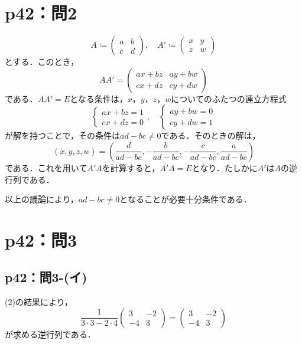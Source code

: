 \documentclass[a4paper,10pt,fleqn]{ltjsarticle}
\begin{document}
\section*{p42：問2}

\begin{leftbar}
    \[
        A \coloneqq \begin{pmatrix} a & b \\ c & d \end{pmatrix},\quad A' \coloneqq \begin{pmatrix} x & y \\ z & w \end{pmatrix}
    \]
    とする．このとき，
    \[
        A A' = \begin{pmatrix} a x + b z & ay + bw \\ cx + dz & cy +dw \end{pmatrix}
    \]
    である．$AA'=E$となる条件は，$x$，$y$，$z$，$w$についてのふたつの連立方程式
    \[
        \begin{cases}
            ax+bz =1 \\
            cx+dz =0
        \end{cases}
        ,\quad
        \begin{cases}
            ay+bw=0 \\
            cy+dw=1
        \end{cases}
    \]
    が解を持つことで，その条件は$ad-bc \ne 0$である．そのときの解は，
    \[
        (x,y,z,w)=  (\frac{d}{ad-bc},-\frac{b}{ad-bc},-\frac{c}{ad-bc},\frac{a}{ad-bc})
    \]
    である．これを用いて$A'A$を計算すると，$A' A =E$となり．たしかに$A'$は$A$の逆行列である．

    以上の議論により，$ad - bc \ne 0$となることが必要十分条件である．
\end{leftbar}

\section*{p42：問3}

\subsection*{p42：問3-(イ)}

\begin{leftbar}
    (2)の結果により，
    \[
        \frac{1}{3 \cdot 3 - 2 \cdot 4} \begin{pmatrix} 3 & -2 \\ -4 & 3 \end{pmatrix} =  \begin{pmatrix} 3 & -2 \\ -4 & 3 \end{pmatrix}
    \]
    が求める逆行列である．
\end{leftbar}
\end{document}

